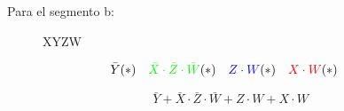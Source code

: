 Para el segmento b:
\begin{figure}[H]
  \centering
    \begin{Karnaugh}{X}{Y}{Z}{W}
    \end{Karnaugh}
\end{figure}

\begin{align*}
  \bar{Y} & (*) &
  \color{green} \bar{X} \cdot \bar{Z} \cdot \bar{W}& (*) &
  \color{blue} Z \cdot W & (*) &
  \color{red} X \cdot W & (*)
  \color{black}
\end{align*}

\begin{equation*}
  \bar{Y} +
  \bar{X} \cdot \bar{Z} \cdot \bar{W}+
  Z \cdot W +
  X \cdot W
\end{equation*}

